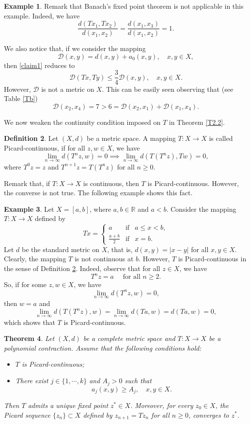 \documentclass[letterpaper,12pt]{article}
\numberwithin{equation}{section}
\newtheorem{theorem}{Theorem}[section]
\theoremstyle{definition}
\newtheorem{definition}[theorem]{Definition}
\newtheorem{example}[theorem]{Example}
\theoremstyle{remark}
\begin{document}
\begin{example}
Remark that Banach's fixed point theorem is not applicable in this example.  Indeed, we have
$$
\frac{d(Tx_1,Tx_2)}{d(x_1,x_2)}=\frac{d(x_1,x_3)}{d(x_1,x_2)}=1. 
$$

We also notice that, if we consider the mapping 
$$
\mathcal{D}(x,y)=d(x,y)+a_0(x,y),\quad x,y\in X, 
$$
then \eqref{claim1} reduces to 
$$
\mathcal{D}(Tx,Ty)\leq \frac{3}{4} \mathcal{D}(x,y),\quad x,y\in X. 
$$
However, $\mathcal{D}$ is not a metric on $X$. This can be easily seen observing that (see Table \ref{Tb}) 
$$
\mathcal{D}(x_2,x_4)=7>6=\mathcal{D}(x_2,x_1)+\mathcal{D}(x_1,x_4). 
$$
\end{example}

We now weaken the continuity condition imposed on $T$ in Theorem \ref{T2.2}. 

\begin{definition}\label{ddef-2.8}
Let $(X,d)$ be a metric space. A mapping  $T: X\to X$ is called Picard-continuous, if for all $z,w\in X$, we have 
$$
\lim_{n\to \infty}d(T^nz,w)=0\implies \lim_{n\to \infty} d(T(T^nz),Tw)=0, 
$$ 
where $T^0z=z$ and $T^{n+1}z=T(T^nz)$ for all $n\geq 0$. 
\end{definition}


Remark that, if $T: X\to X$ is continuous, then $T$ is Picard-continuous. However, the converse is not true. The following example shows this fact.


\begin{example}\label{ex2.9}
Let $X=[a,b]$, where $a,b\in \mathbb{R}$ and $a<b$. Consider the mapping  $T: X\to X$  defined by 
$$
Tx=\left\{\begin{array}{llll}
a &\mbox{if}& a\leq  x< b,\\[4pt]
\frac{a+b}{2} 	 &\mbox{if}& x=b.
\end{array}
\right.
$$	
Let $d$ be the standard metric on $X$, that is, $d(x,y)=|x-y|$ for all $x,y\in X$.  Clearly, the mapping $T$ is not continuous at $b$. However, $T$ is Picard-continuous in the sense of Definition \ref{ddef-2.8}. Indeed,  observe  that for all $z\in X$, we have 
$$
T^nz=a\quad \mbox{ for all }n\geq 2. 
$$
So, if for some $z,w\in X$, we have 
$$
\lim_{n\to \infty}d(T^nz,w)=0,
$$
then $w=a$ and 
$$
\lim_{n\to \infty}d(T(T^nz),w)=\lim_{n\to\infty} d(Ta,w)=d(Ta,w)=0, 
$$
which shows that $T$ is Picard-continuous.
\end{example}

\begin{theorem}\label{T2.10}
Let $(X,d)$ be a complete metric space and $T: X\to X$ be a polynomial contraction. Assume that the following conditions hold:
\begin{itemize}
\item[{\rm{(i)}}]$T$ is Picard-continuous;
\item[{\rm{(ii)}}] There exist $j\in\{1,\cdots,k\}$ and 	$A_j>0$ such that 
$$
a_j(x,y)\geq A_j,\quad x,y\in X.
$$
\end{itemize}
Then $T$ admits a unique fixed point $z^*\in X$. Moreover, for every $z_0\in X$, the Picard sequence  $\{z_n\}\subset X$ defined by $z_{n+1}=Tz_n$ for all $n\geq 0$, converges to $z^*$. 
\end{theorem}
\end{document}
